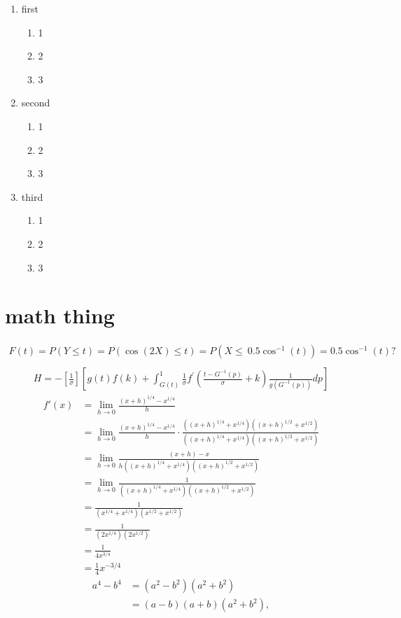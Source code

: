 \documentclass[10pt,a4paper]{report}
\begin{document}
\begin{enumerate}
    \item first
    \begin{enumerate}
        \item 1
        \item 2
        \item 3
    \end{enumerate}
    \item second
    \begin{enumerate}
        \item 1
        \item 2
        \item 3
    \end{enumerate}
    \item third
    \begin{enumerate}
        \item 1
        \item 2
        \item 3
    \end{enumerate}
    \end{enumerate}
\clearpage
\section{math thing}
\begin{align*}
    F(t)=P(Y\le t)=P(\cos(2X)\le t)=P(X\le\ 0.5 \cos^{-1}(t))=0.5 \cos^{-1}(t)? \\
\end{align*}
\begin{align*}
    H=-\left[\frac{1}{\sigma}\right]\left[g(t)f\left( k\right) +\int_{G(t)}^{1}\frac{1}{\sigma }f^{\prime }\left( \frac{t-G^{-1}(p)}{\sigma }%
+k\right) \frac{1}{g\left( G^{-1}(p)\right) }dp\right]
\end{align*}
\begin{align*}
            f'(x)           &= \lim_{h\rightarrow 0}\frac{(x+h)^{1/4}-x^{1/4}}{h}   \\
                            &=  \lim_{h\rightarrow 0}\frac{(x+h)^{1/4}-x^{1/4}}{h}\cdot \frac{((x+h)^{1/4}+x^{1/4})((x+h)^{1/2}+x^{1/2})}{((x+h)^{1/4}+x^{1/4})((x+h)^{1/2}+x^{1/2})}\\
                            &=  \lim_{h\rightarrow 0}\frac{(x+h)-x}{h((x+h)^{1/4}+x^{1/4})((x+h)^{1/2}+x^{1/2})}    \\  
                            &=  \lim_{h\rightarrow 0}\frac{1}{((x+h)^{1/4}+x^{1/4})((x+h)^{1/2}+x^{1/2})}   \\
                            &= \frac{1}{(x^{1/4}+x^{1/4})(x^{1/2}+x^{1/2})} \\
                            &=  \frac{1}{(2x^{1/4})(2x^{1/2})}  \\
                            &=  \frac{1}{4x^{3/4}}  \\
                            &=  \frac{1}{4}x^{-3/4}
\end{align*}
\begin{align*}
    a^4-b^4 &= (a^2-b^2)(a^2+b^2)   \\
        &= (a-b)(a+b)(a^2+b^2), 
\end{align*}



  
\end{document}
